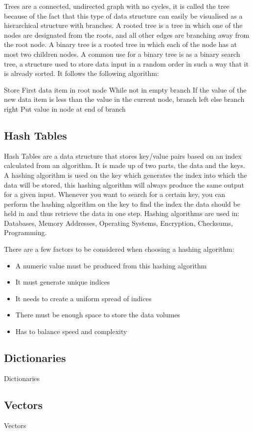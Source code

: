  Trees are a connected, undirected graph with no cycles, it is called the tree because of the fact that this type of data structure can easily be visualised as a hierarchical structure with branches. A rooted tree is a tree in which one of the nodes are designated from the roots, and all other edges are branching away from the root node. A binary tree is a rooted tree in which each of the node has at most two children nodes. A common use for a binary tree is as a binary search tree, a structure used to store data input in a random order in such a way that it is already sorted. It follows the following algorithm:
  
  Store First data item in root node
  While not in empty branch
	  If the value of the new data item is less than the value in the current node, branch left
	  else branch right
  Put value in node at end of branch
  
\subsection{Hash Tables}
  
  Hash Tables are a data structure that stores key/value pairs based on an index calculated from an algorithm. It is made up of two parts, the data and the keys. A hashing algorithm is used on the key which generates the index into which the data will be stored, this hashing algorithm will always produce the same output for a given input. Whenever you want to search for a certain key, you can perform the hashing algorithm on the key to find the index the data should be held in and thus retrieve the data in one step. Hashing algorithms are used in: Databases, Memory Addresses, Operating Systems, Encryption, Checksums, Programming.
  
  There are a few factors to be considered when choosing a hashing algorithm:
  \begin{itemize}
  	\item A numeric value must be produced from this hashing algorithm
  	\item It must generate unique indices
  	\item It needs to create a uniform spread of indices
  	\item There must be enough space to store the data volumes
  	\item Has to balance speed and complexity
  \end{itemize}
\subsection{Dictionaries}
  
  Dictionaries
\subsection{Vectors}
  
  Vectors